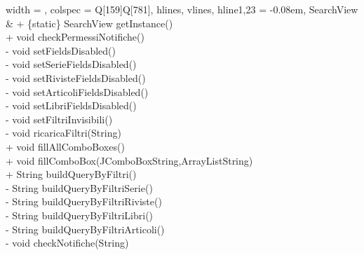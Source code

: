 \begin{longtblr}[
    label = none,
    entry = none,
  ]{
    width = \linewidth,
    colspec = {Q[159]Q[781]},
    hlines,
    vlines,
    hline{1,23} = {-}{0.08em},
  }
  SearchView             & {+ \{static\} SearchView getInstance()\\+ void checkPermessiNotifiche()\\- void setFieldsDisabled()\\- void setSerieFieldsDisabled()\\- void setRivisteFieldsDisabled()\\- void setArticoliFieldsDisabled()\\- void setLibriFieldsDisabled()\\- void setFiltriInvisibili()\\- void ricaricaFiltri(String)\\+ void fillAllComboBoxes()\\+ void fillComboBox(JComboBoxString,ArrayListString)\\+ String buildQueryByFiltri()\\- String buildQueryByFiltriSerie()\\- String buildQueryByFiltriRiviste()\\- String buildQueryByFiltriLibri()\\- String buildQueryByFiltriArticoli()\\- void checkNotifiche(String)}                                                                                                                                                                                                                                                                                                                                                                                                                                                                                                                                                                                                                                                                                                                                                                                                                                                                                                                                                                                                                                                                                                                                                                                                                                                                                 \\

\end{longtblr}
